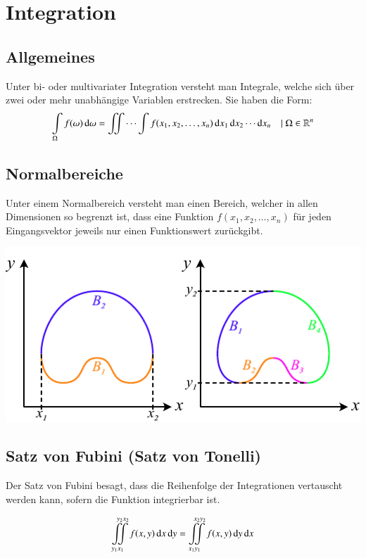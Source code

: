 \columnbreak
\section{Integration}
\subsection{Allgemeines}
Unter bi- oder multivariater Integration versteht man Integrale, welche sich über zwei oder mehr unabhängige Variablen erstrecken.
Sie haben die Form:
\[
    \int\limits_{\Omega} f(\omega) \mathop{} \! \mathrm{d} \omega = \iint \cdots \int f(x_1, x_2, \ldots, x_n) \mathop{} \! \mathrm{d} x_1 \mathop{} \! \mathrm{d} x_2 \cdots \mathop{} \! \mathrm{d} x_n
    \quad |\; \Omega \in \mathbb{R}^n
\]

\subsection{Normalbereiche}
Unter einem Normalbereich versteht man einen Bereich, welcher in allen Dimensionen so begrenzt ist, 
dass eine Funktion $f(x_1, x_2, \ldots, x_n)$ für jeden Eingangsvektor jeweils nur einen Funktionswert zurückgibt.


\begin{center}
    \includegraphics[width=0.8\columnwidth]{images/Normalbereiche_2D.pdf}
\end{center}


\subsection{Satz von Fubini (Satz von Tonelli)}
Der Satz von Fubini besagt, dass die Reihenfolge der Integrationen vertauscht werden kann, sofern die Funktion integrierbar ist.

\[
    \iint\limits_{y_1 x_1}^{\; y_2 x_2} f(x,y)\diff x \diff y = \iint\limits_{x_1 y_1}^{\; x_2 y_2} f(x,y)\diff y \diff x%
\]

